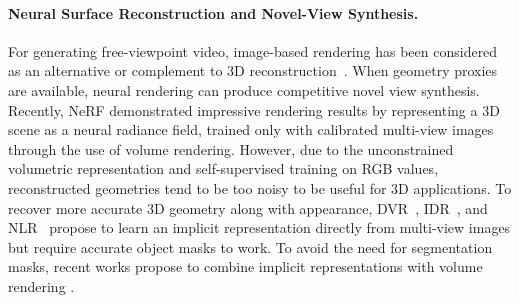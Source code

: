 \paragraph{Neural Surface Reconstruction and Novel-View Synthesis.} 
For generating free-viewpoint video, image-based rendering has been considered as an alternative or complement to 3D reconstruction~\cite{carranza2003free,wu2020multi,liu2021neural,kwon2021neural, liu2021neural, peng2021animatable, weng2022humannerf,xu2021h}. 
When geometry proxies are available, neural rendering \cite{aliev2020neural,thies2019deferred,jena2022neural} can produce competitive novel view synthesis. Recently, NeRF\cite{mildenhall2020nerf} demonstrated impressive rendering results by representing a 3D scene as a neural radiance field, trained only with calibrated multi-view images through the use of volume rendering. However, due to the unconstrained volumetric representation and self-supervised training on RGB values, reconstructed geometries tend to be too noisy to be useful for 3D applications. 
To recover more accurate 3D geometry along with appearance, DVR~\cite{niemeyer2020differentiable}, IDR~\cite{yariv2020multiview}, and NLR~\cite{kellnhofer2021neural} propose to learn an implicit representation directly from multi-view images but require accurate object masks to work. To avoid the need for segmentation masks, recent works propose to combine implicit representations with volume rendering \cite{oechsle2021unisurf, yariv2021volume, wang2021neus}. 
